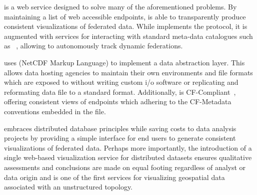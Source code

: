 \sciwms{} is a web service designed to solve many of the
aforementioned problems. By maintaining a list of web accessible
endpoints, \sciwms{} is able to transparently produce consistent
visualizations of federated data. While \sciwms{} implements the
\ogc{} \wms{} protocol, it is augmented with services for interacting
with standard meta-data catalogues such as \csw{}~\cite{csw14},
allowing \sciwms{} to autonomously track dynamic federations.

\sciwms{} uses \ncml{} (NetCDF Markup Language) to implement a data
abstraction layer. This allows data hosting agencies to maintain their
own environments and file formats which are exposed to \sciwms{}
without writing custom i/o software or replicating and reformating
data file to a standard format. Additionally, \sciwms{} is
CF-Compliant~\cite{cf}, offering consistent views of endpoints which
adhering to the CF-Metadata conventions embedded in the \ncml{} file.

\sciwms{} embraces distributed database principles while saving costs
to data analysis projects by providing a simple interface for end
users to generate consistent visualizations of federated data. Perhaps
more importantly, the introduction of a single web-based visualization
service for distributed datasets ensures qualitative assessments and
conclusions are made on equal footing regardless of analyst or data
origin and is one of the first services for visualizing geospatial
data associated with an unstructured topology.
